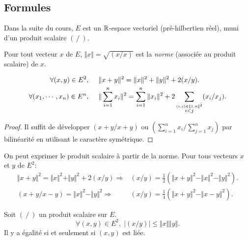 \subsection{Formules}
Dans la suite du cours, $E$ est un $\mathbb{R}$-espace vectoriel (pré-hilbertien réel), muni d'un produit scalaire $(~/~)$.
\begin{nota}
Pour tout vecteur $x$ de $E$, $ \Vert x \Vert  = \sqrt{ (x/x) }$ est la \emph{norme} (associée au produit scalaire) de $x$.
\end{nota}
\begin{prop}
\begin{align*}
\forall (x,y) \in E^2,\hspace{0.5cm}     &\Vert x+y \Vert ^2 =  \Vert x \Vert ^2 +  \Vert y \Vert ^2 + 2(x/y). \\
\forall (x_1,\cdots,x_n)\in E^n,\hspace{0.5cm} &\Vert \sum_{i=1}^n x_i \Vert^2 = \sum_{i=1}^n \Vert x_i \Vert^2 + 2 \sum_{\stackrel{(i,j)\in\llbracket 1,n \rrbracket^2}{i < j}}(x_i / x_j).
\end{align*}
\end{prop}
\begin{proof}
Il suffit de développer $(x+y/x+y)$ ou $(\sum_{i=1}^n x_i/ \sum_{j=1}^n x_j)$ par bilinéarité en utilisant le caractère symétrique.
\end{proof}
\newpage
\begin{prop}
On peut exprimer le produit scalaire à partir de la norme. Pour tous vecteurs $x$ et $y$ de $E^2$:
\begin{align*}
 \Vert x+ y\Vert^2 = \Vert x \Vert ^2 + \Vert y \Vert^2 + 2 (x/y) \Rightarrow& 
 (x/y) = \frac{1}{2} \left(  \Vert x+y \Vert ^2 -  \Vert x \Vert ^2 -  \Vert y \Vert ^2 \right).\\
 (x+y/x-y) = \Vert x \Vert^2 - \Vert y \Vert^2 \Rightarrow& (x/y)= \frac{1}{4} \left(  \Vert x+y \Vert ^2 -  \Vert x-y \Vert ^2 \right). 
\end{align*}
\end{prop}
\newpage
{}
\begin{prop}
Soit $(~/~)$ un produit scalaire sur $E$.
\begin{displaymath}
\forall(x,y) \in E^2,\;| (x/y) | \leq  \Vert  x  \Vert   \Vert  y  \Vert .
\end{displaymath}
Il y a égalité si et seulement si $(x,y)$ est liée.
\end{prop}
